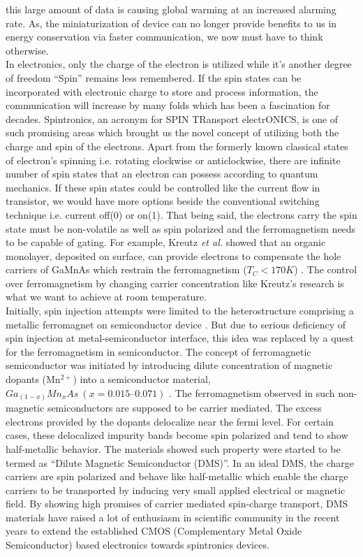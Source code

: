 \documentclass[main.tex]{subfiles}
\begin{document}
this large amount of data is causing global warming at an increased alarming rate. As, the miniaturization of device can no longer provide benefits to us in energy conservation via faster communication, we now must have to think otherwise. \\


In electronics, only the charge of the electron is utilized while it’s another degree of freedom “Spin” remains less remembered. If the spin states can be incorporated with electronic charge to store and process information, the communication will increase by many folds which has been a fascination for decades. Spintronics, an acronym for SPIN TRansport electrONICS, is one of such promising areas which brought us the novel concept of utilizing both the charge and spin of the electrons. Apart from the formerly known classical states of electron's spinning i.e. rotating clockwise or anticlockwise, there are infinite number of spin states that an electron can possess according to quantum mechanics. If these spin states could be controlled like the current flow in transistor, we would have more options beside the conventional switching technique i.e. current off(0) or on(1). That being said, the electrons carry the spin state must be non-volatile as well as spin polarized and the ferromagnetism needs to be capable of gating.  For example, Kreutz \textit{et al.} showed that an organic monolayer, deposited on surface, can provide electrons to compensate the hole carriers of GaMnAs which restrain the ferromagnetism (\(T_C < 170 K\)) \cite{kreutz2003modification}. The control over ferromagnetism by changing carrier concentration like Kreutz's research is what we want to achieve at room temperature. \\

Initially, spin injection attempts were limited to the heterostructure comprising a metallic ferromagnet on semiconductor device \cite{Datta1990,DasSarma2000}. But due to serious deficiency of spin injection at metal-semiconductor interface, this idea was replaced by a quest for the ferromagnetism in semiconductor. The concept of ferromagnetic semiconductor was initiated by introducing dilute concentration of magnetic dopants (Mn$^{2+}$) into a semiconductor material, \(Ga_{(1-x)}Mn_xAs \ (x=0.015–0.071)\) \cite{matsukura1998transport}. The ferromagnetism observed in such non-magnetic semiconductors are supposed to be carrier mediated. The excess electrons provided by the dopants delocalize near the fermi level. For certain cases, these delocalized impurity bands become spin polarized and tend to show half-metallic behavior. The materials showed such property were started to be termed as “Dilute Magnetic Semiconductor (DMS)”. In an ideal DMS, the charge carriers are spin polarized and behave like half-metallic which enable the charge carriers to be transported by inducing very small applied electrical or magnetic field. By showing high promises of carrier mediated spin-charge transport, DMS materials have raised a lot of enthusiasm in scientific community in the recent years to extend the established CMOS (Complementary Metal Oxide Semiconductor) based electronics towards spintronics devices. \\
\end{document}
